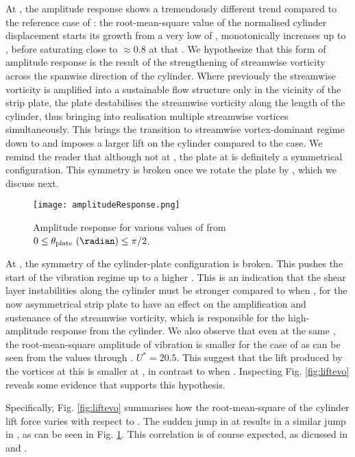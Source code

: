 \documentclass[a4paper]{article}
\begin{document}
At \ptlt{} \es{} \rze{}, the amplitude response shows a tremendously different trend compared to the reference case of \ptlt{} \es{} \rfo{}: the root-mean-square value of the normalised cylinder displacement \yrms{} starts its growth from a very low \ured{} of \urfo{}, monotonically increases up to \ured{} \es{} \urei{}, before saturating close to \yrms{} $\approx 0.8$ at that \ured{}. We hypothesize that this form of amplitude response is  the result of the strengthening of streamwise vorticity across the spanwise direction of the cylinder. Where previously the streamwise vorticity is amplified into a sustainable flow structure only in the vicinity of the strip plate, the \rze{} plate destabilises the streamwise vorticity along the length of the cylinder, thus bringing into realisation multiple streamwise vortices simultaneously. This brings the transition to streamwise vortex-dominant regime down to \ured{} \es{} \urfo{} and imposes a larger lift on the cylinder compared to the \rfo{} case. We remind the reader that although not at \rfo{}, the plate at \rze{} is definitely a symmetrical configuration. This symmetry is broken once we rotate the plate by \ron{}, which we discuss next.

\begin{figure}[h]
  \centering
  \texttt{[image: amplitudeResponse.png]}
  \caption{Amplitude response for various values of \ptlt{} from $0 \leq \theta_{\text{plate}} \text{ (\radian)} \leq \pi/2$.}
  \label{fig:ampresp}
\end{figure}

At \ptlt{} \es{} \ron{}, the symmetry of the cylinder-plate configuration is broken. This pushes the start of the vibration regime up to a higher \ured{} \es{} \urni{}. This is an indication that the shear layer instabilities along the cylinder must be stronger compared to when \ptlt{} \es{} \rze{}, for the now asymmetrical strip plate to have an effect on the amplification and sustenance of the streamwise vorticity, which is responsible for the high-amplitude response from the cylinder. We also observe that even at the same \ured{}, the root-mean-square amplitude of vibration is smaller for the case of \ron{} as can be seen from the \yrms{} values \ured{} \es{} \urni{} through \urtt{}. $U^{*}=20.5$. This suggest that the lift produced by the vortices at this \ptlt{} is smaller at \ron{}, in contrast to when \ptlt{} \es{} \rze{}. Inspecting Fig. \ref{fig:liftevo} reveals some evidence that supports this hypothesis.

Specifically, Fig. \ref{fig:liftevo} summarises how the root-mean-square of the cylinder lift force varies with respect to \ured{}. The sudden jump in \flrms{} at \ured{} \es{} \urni{} results in a similar jump in \yrms{}, as can be seen in Fig. \ref{fig:ampresp}. This correlation is of course expected, as dicussed in \textcite{Raghavan2007} and \textcite{Bernitsas2008}.
\end{document}
